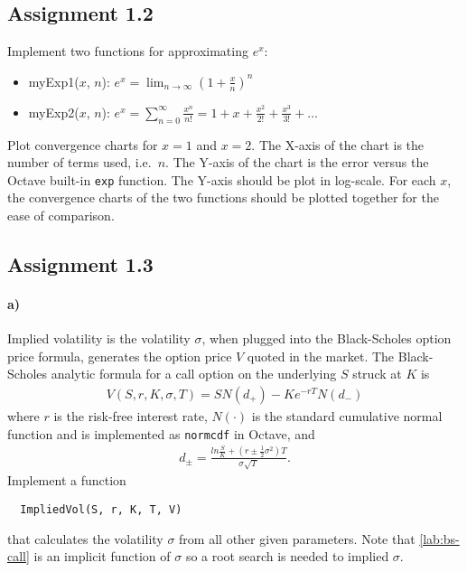 \documentclass[11pt,a4paper,hidelinks,fleqn]{article}            %
\begin{document}
\subsection*{Assignment 1.2}
Implement two functions for approximating $e^x$:
\begin{itemize}
\item myExp1($x$, $n$): $\displaystyle e^x = \lim_{n\rightarrow\infty}\left(1+\frac x n \right)^n$
\item myExp2($x$, $n$): $\displaystyle e^x = \sum_{n=0}^{\infty} \frac{x^n}{n!} = 1 + x + \frac{x^2}{2!} + \frac{x^3}{3!} + \ldots$
\end{itemize}
Plot convergence charts for $x=1$ and $x=2$.
The X-axis of the chart is the number of terms used, i.e.\ $n$.
The Y-axis of the chart is the error versus the Octave built-in \verb=exp= function.
The Y-axis should be plot in log-scale.
For each $x$, the convergence charts of the two functions should be plotted together for the ease of comparison.

\subsection*{Assignment 1.3}

\paragraph{a)} Implied volatility is the volatility $\sigma$,
when plugged into the Black-Scholes option price formula, 
generates the option price $V$ quoted in the market.
The Black-Scholes analytic formula for a call option on the underlying $S$ struck at $K$ is
\begin{align}
V(S, r, K, \sigma, T) = S N(d_+) - K e^{-rT} N(d_-)
\label{lab:bs-call}
\end{align}
where $r$ is the risk-free interest rate,
$N(\cdot)$ is the standard cumulative normal function and is implemented as \verb=normcdf= in Octave, and
\begin{align*}
d_{\pm} = \frac{ln\frac{S}{K} + (r \pm \frac{1}{2}\sigma^2)T}{\sigma\sqrt{T}}.
\end{align*}
Implement a function 
\begin{verbatim}
  ImpliedVol(S, r, K, T, V)
\end{verbatim}
that calculates the volatility $\sigma$ from all other given parameters.
Note that \eqref{lab:bs-call} is an implicit function of $\sigma$ so a root search is needed to implied $\sigma$.
\end{document}
